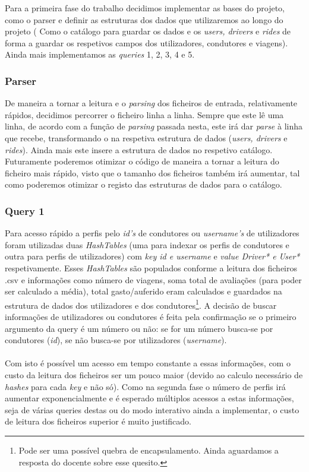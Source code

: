 \documentclass{article}
\begin{document}
            Para a primeira fase do trabalho decidimos implementar as bases do projeto, como o parser e definir as estruturas dos dados que utilizaremos ao longo do projeto ( Como o catálogo para guardar os dados e os \emph{users, drivers} e \emph{rides} de forma a guardar os respetivos campos dos utilizadores, condutores e viagens). Ainda mais implementamos as \emph{queries} 1, 2, 3, 4 e 5. 
        \subsubsection{Parser}
            De maneira a tornar a leitura e o \emph{parsing} dos ficheiros de
            entrada, relativamente rápidos, decidimos percorrer o ficheiro linha a linha.
            Sempre que este lê uma linha, de acordo com a função de \emph{parsing} passada
            nesta, este irá dar \emph{parse} à linha que recebe, transformando o na respetiva estrutura de dados (\emph{users, drivers} e \emph{rides}). Ainda mais este insere a estrutura de dados no respetivo catálogo.
            \\Futuramente poderemos otimizar o código de maneira a tornar a leitura do ficheiro mais rápido, visto que o tamanho dos ficheiros também  irá aumentar, tal como poderemos otimizar o registo das estruturas de dados para o catálogo.
        \subsubsection{Query 1}
            Para acesso rápido a perfis pelo \emph{id's} de condutores ou 
            \emph{username's} de utilizadores foram utilizadas duas 
            \emph{HashTables} (uma para indexar os perfis de condutores e outra 
            para perfis de utilizadores) com \emph{key id e username} e 
            \emph{value Driver* e User*} respetivamente. Esses \emph{HashTables}
            são populados conforme a leitura dos ficheiros {.csv} e informações
            como número de viagens, soma total de avaliações (para poder ser 
            calculado a média), total gasto/auferido eram calculados e guardados 
            na estrutura de dados dos utilizadores e dos condutores\footnote{Pode 
            ser uma possível quebra de encapsulamento. Ainda aguardamos a resposta
            do docente sobre esse quesito.}. A decisão de buscar informações de
            utilizadores ou condutores é feita pela confirmação se o primeiro 
            argumento da query é um número ou não: se for um número busca-se por
            condutores (\emph{id}), se não busca-se por utilizadores (\emph{username}).
            \\
            \\Com isto é possível um acesso em tempo constante a essas
            informações, com o custo da leitura dos ficheiros ser um pouco maior
            (devido ao calculo necessário de \emph{hashes} para cada \emph{key} 
            e não só). Como na segunda fase o número de perfis irá aumentar
            exponencialmente e é esperado múltiplos acessos a estas informações, 
            seja de várias queries destas ou do modo interativo ainda a 
            implementar, o custo de leitura dos ficheiros superior é muito 
            justificado.
\end{document}
